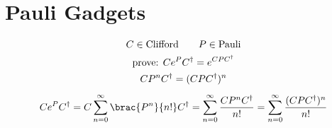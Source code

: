 \chapter{\label{pauli-gadgets}Pauli Gadgets}


\begin{equation*}
\begin{gathered}
    C \in \text{Clifford} \qquad P \in \text{Pauli} \\
    \text{prove: } Ce^PC^\dagger = e^{CPC^\dagger} \\
    CP^nC^\dagger  = (CPC^\dagger)^n \\[1ex]
    Ce^PC^\dagger = C \sum_{n=0}^\infty \brac{P^n}{n!} C^\dagger = \sum_{n=0}^\infty \frac{C P^n C^\dagger}{n!} = \sum_{n=0}^\infty \frac{(C P C^\dagger)^n}{n!}
\end{gathered}
\end{equation*}
